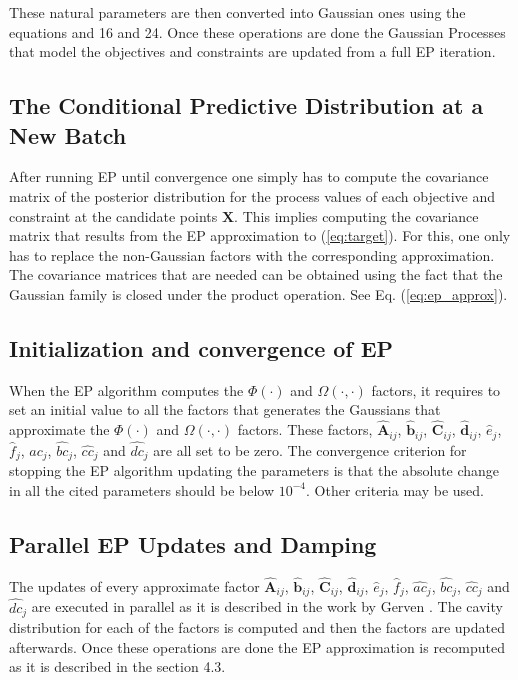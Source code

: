 These natural parameters are then converted into Gaussian ones using the equations and 16 and 24. Once these operations are done the Gaussian Processes that model the objectives and constraints are updated from a full EP iteration.

\subsection{The Conditional Predictive Distribution at a New Batch}

After running EP until convergence one simply has to compute the covariance matrix of the posterior distribution for the process values of each objective and constraint at the candidate points $\mathbf{X}$. This implies computing the covariance matrix that results from the EP approximation to (\ref{eq:target}).  For this, one only has to replace the non-Gaussian factors with the corresponding approximation. The covariance matrices that are needed can be obtained using the fact that the Gaussian family is closed under the product operation. See Eq. (\ref{eq:ep_approx}).

\subsection{Initialization and convergence of EP}

When the EP algorithm computes the $\Phi(\cdot)$ and $\Omega(\cdot,\cdot)$ factors, it requires to set an initial value to all the factors that generates the Gaussians that approximate the $\Phi(\cdot)$ and $\Omega(\cdot,\cdot)$ factors. These factors, $\hat{\boldsymbol{A}}_{ij}$, $\hat{\boldsymbol{b}}_{ij}$, $\hat{\boldsymbol{C}}_{ij}$, $\hat{\boldsymbol{d}}_{ij}$, $\hat{e}_{j}$, $\hat{f}_{j}$, $\hat{ac}_j$, $\hat{bc}_j$, $\hat{cc}_j$ and $\hat{dc}_j$ are all set to be zero. The convergence criterion for stopping the EP algorithm updating the parameters is that the absolute change in all the cited parameters should be below $10^{-4}$. Other criteria may be used.

\subsection{Parallel EP Updates and Damping}

The updates of every approximate factor $\hat{\boldsymbol{A}}_{ij}$, $\hat{\boldsymbol{b}}_{ij}$, $\hat{\boldsymbol{C}}_{ij}$, $\hat{\boldsymbol{d}}_{ij}$, $\hat{e}_{j}$, $\hat{f}_{j}$, $\hat{ac}_j$, $\hat{bc}_j$, $\hat{cc}_j$ and $\hat{dc}_j$ are executed in parallel as it is described in the work by Gerven \cite{gerven2009bayesian}. The cavity distribution for each of the factors is computed and then the factors are updated afterwards. Once these operations are done the EP approximation is recomputed as it is described in the section 4.3.

